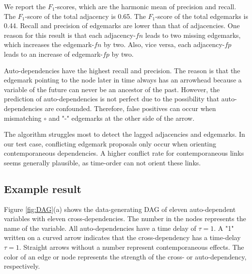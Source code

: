 \documentclass[conference]{IEEEtran}
\begin{document}
We report the $F_1$-scores, which are the harmonic mean of precision and recall. The $F_1$-score of the total adjacency is 0.65.
The $F_1$-score of the total edgemarks is 0.44.
Recall and precision of edgemarks are lower than that of adjacencies. One reason for this result is that each adjacency-$fn$ leads to two missing edgemarks, which increases the edgemark-$fn$ by two.
Also, vice versa, each adjacency-$fp$ leads to an increase of edgemark-$fp$ by two.

Auto-dependencies have the highest recall and precision. The reason is that the edgemark pointing to the node later in time always has an arrowhead because a variable of the future can never be an ancestor of the past. However, the prediction of auto-dependencies is not perfect due to the possibility that auto-dependencies are confounded. Therefore, false positives can occur when mismatching $\circ$ and "-" edgemarks at the other side of the arrow.

The algorithm struggles most to detect the lagged adjacencies and edgemarks.
In our test case, conflicting edgemark proposals only occur when orienting contemporaneous dependencies. A higher conflict rate for contemporaneous links seems generally plausible, as time-order can not orient these links.


\subsection{Example result}
Figure \ref{fig:DAG}(a) shows the data-generating DAG of eleven auto-dependent variables with eleven cross-dependencies.
The number in the nodes represents the name of the variable.
All auto-dependencies have a time delay of $\tau=1$.
A "1" written on a curved arrow indicates that the cross-dependency has a time-delay $\tau=1$. Straight arrows without a number represent contemporaneous effects. 
The color of an edge or node represents the strength of the cross- or auto-dependency, respectively.
\end{document}
